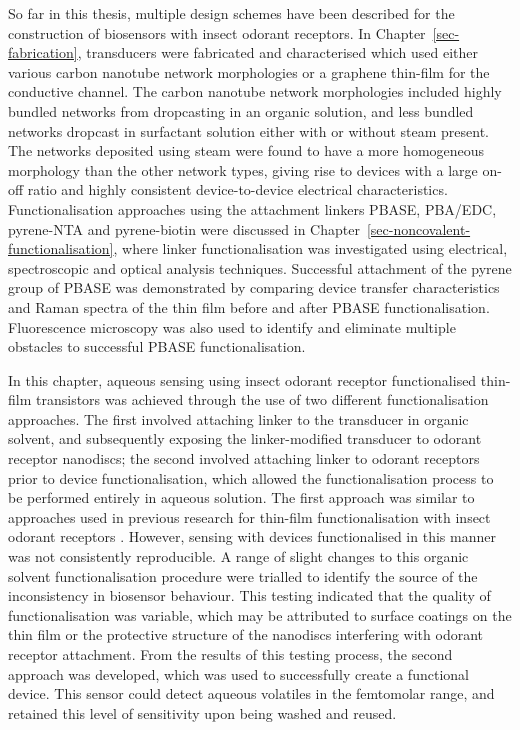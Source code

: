 \documentclass[
  a4paper,
]{scrbook}
\begin{document}
So far in this thesis, multiple design schemes have been described for
the construction of biosensors with insect odorant receptors. In
Chapter~\ref{sec-fabrication}, transducers were fabricated and
characterised which used either various carbon nanotube network
morphologies or a graphene thin-film for the conductive channel. The
carbon nanotube network morphologies included highly bundled networks
from dropcasting in an organic solution, and less bundled networks
dropcast in surfactant solution either with or without steam present.
The networks deposited using steam were found to have a more homogeneous
morphology than the other network types, giving rise to devices with a
large on-off ratio and highly consistent device-to-device electrical
characteristics. Functionalisation approaches using the attachment
linkers PBASE, PBA/EDC, pyrene-NTA and pyrene-biotin were discussed in
Chapter~\ref{sec-noncovalent-functionalisation}, where linker
functionalisation was investigated using electrical, spectroscopic and
optical analysis techniques. Successful attachment of the pyrene group
of PBASE was demonstrated by comparing device transfer characteristics
and Raman spectra of the thin film before and after PBASE
functionalisation. Fluorescence microscopy was also used to identify and
eliminate multiple obstacles to successful PBASE functionalisation.

In this chapter, aqueous sensing using insect odorant receptor
functionalised thin-film transistors was achieved through the use of two
different functionalisation approaches. The first involved attaching
linker to the transducer in organic solvent, and subsequently exposing
the linker-modified transducer to odorant receptor nanodiscs; the second
involved attaching linker to odorant receptors prior to device
functionalisation, which allowed the functionalisation process to be
performed entirely in aqueous solution. The first approach was similar
to approaches used in previous research for thin-film functionalisation
with insect odorant receptors \autocite{Murugathas2019a,Murugathas2020}.
However, sensing with devices functionalised in this manner was not
consistently reproducible. A range of slight changes to this organic
solvent functionalisation procedure were trialled to identify the source
of the inconsistency in biosensor behaviour. This testing indicated that
the quality of functionalisation was variable, which may be attributed
to surface coatings on the thin film or the protective structure of the
nanodiscs interfering with odorant receptor attachment. From the results
of this testing process, the second approach was developed, which was
used to successfully create a functional device. This sensor could
detect aqueous volatiles in the femtomolar range, and retained this
level of sensitivity upon being washed and reused.
\end{document}
